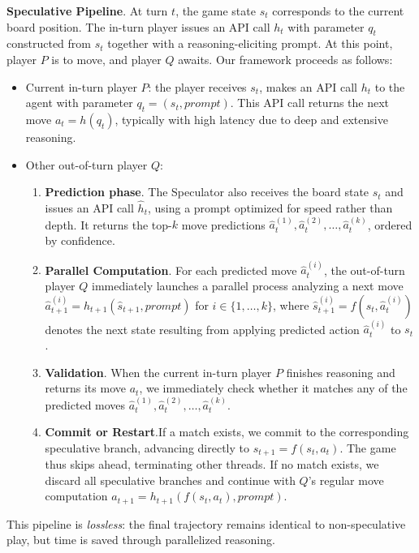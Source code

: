 \textbf{Speculative Pipeline}. At turn $t$, the game state $s_t$ corresponds to the current board position. The in-turn player issues an API call $h_t$ with parameter $q_t$ constructed from $s_t$ together with a reasoning-eliciting prompt. At this point, player $P$ is to move, and player $Q$ awaits. Our framework  proceeds as follows:
\begin{itemize}[leftmargin=*]
    \item Current in-turn player $P$: the player receives $s_t$, makes an API call $h_t$ to the agent with parameter $q_t = (s_t, {prompt})$. This API call returns the next move $a_t = h(q_t)$, typically with high latency due to deep and extensive reasoning.
    \item Other out-of-turn player $Q$:
    \begin{enumerate}
        \item \textbf{Prediction phase}. The Speculator also receives the board state $s_t$ and issues an API call $\hat{h}_t$, using a prompt optimized for speed rather than depth. It returns the top-$k$ move predictions $\hat{a}_t^{(1)}, \hat{a}_t^{(2)}, \dots, \hat{a}_t^{(k)}$, ordered by confidence.
        \item \textbf{Parallel Computation}. For each predicted move $\hat{a}_t^{(i)}$, the out-of-turn player $Q$ immediately launches a parallel process analyzing a next move $\hat{a}_{t+1}^{(i)} = h_{t+1}(\hat{s}_{t+1}, {prompt})$ for $i \in \{1, \ldots, k\}$, where $ \hat{s}_{t+1}^{(i)} = f(s_t,\hat{a}_t^{(i)})$ denotes the next state resulting from applying predicted action $\hat{a}_t^{(i)}$ to $s_t$. 
        \item \textbf{Validation}. When the current in-turn player $P$ finishes reasoning and returns its move $a_t$, we immediately check whether it matches any of the predicted moves $\hat{a}_t^{(1)}, \hat{a}_t^{(2)}, \dots, \hat{a}_t^{(k)}$. 
        \item \textbf{Commit or Restart}.If a match exists, we commit to the corresponding speculative branch, advancing directly to $s_{t+1} = f(s_t, a_t)$. The game thus skips ahead, terminating other threads. If no match exists, we discard all speculative branches and continue with $Q$’s regular move computation $a_{t+1} = h_{t+1}(f(s_{t},a_t),{prompt})$. 
    \end{enumerate}
\end{itemize}

This pipeline is \textit{lossless}: the final trajectory remains identical to non-speculative play, but time is saved through parallelized reasoning.

